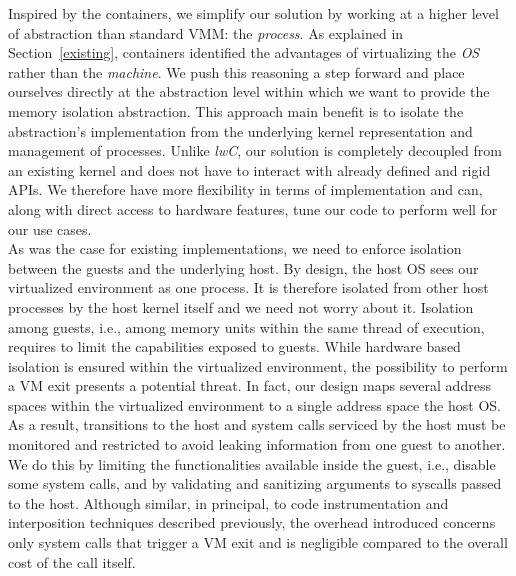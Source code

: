 \documentclass[letterpaper,twocolumn,10pt]{article}
\begin{document}
Inspired by the containers, we simplify our solution by working at a higher level of abstraction than standard VMM: the \emph{process}.
As explained in Section~\ref{existing}, containers identified the advantages of virtualizing the \emph{OS} rather than the \emph{machine}.
We push this reasoning a step forward and place ourselves directly at the abstraction level within which we want to provide the memory isolation abstraction.
This approach main benefit is to isolate the abstraction's implementation from the underlying kernel representation and management of processes.
Unlike \emph{lwC}, our solution is completely decoupled from an existing kernel and does not have to interact with already defined and rigid APIs.
We therefore have more flexibility in terms of implementation and can, along with direct access to hardware features, tune our code to perform well for our use cases.\\

As was the case for existing implementations\cite{DBLP:conf/osdi/LittonVE0BD16,DBLP:conf/usenix/FordC08,DBLP:journals/cacm/YeeSDCMOONF10}, we need to enforce isolation between the guests and the underlying host.
By design, the host OS sees our virtualized environment as one process.
It is therefore isolated from other host processes by the host kernel itself and we need not worry about it.
Isolation among guests, i.e., among memory units within the same thread of execution, requires to limit the capabilities exposed to guests.
While hardware based isolation is ensured within the virtualized environment, the possibility to perform a VM exit presents a potential threat.
In fact, our design maps several address spaces within the virtualized environment to a single address space the host OS.
As a result, transitions to the host and system calls serviced by the host must be monitored and restricted to avoid leaking information from one guest to another. 
We do this by limiting the functionalities available inside the guest, i.e., disable some system calls, and by validating and sanitizing arguments to syscalls passed to the host.
Although similar, in principal, to code instrumentation and interposition techniques described previously, the overhead introduced concerns only system calls that trigger a VM exit and is negligible compared to the overall cost of the call itself. \\
\end{document}
